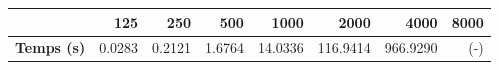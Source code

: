 \begin{tabular}{lrrrrrrr}
\toprule
{} &   125  &   250  &   500  &    1000 &     2000 &     4000 &  8000 \\
\midrule
\textbf{Temps (s)} & 0.0283 & 0.2121 & 1.6764 & 14.0336 & 116.9414 & 966.9290 &   (-) \\
\bottomrule
\end{tabular}
